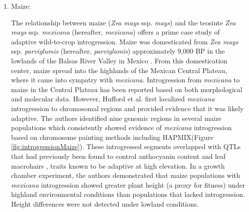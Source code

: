 \documentclass[11pt]{article}
\begin{document}
\begin{enumerate}
\item{Maize:}

The relationship between maize (\emph{Zea mays} ssp. \emph{mays}) and the teosinte \emph{Zea mays} ssp. \emph{mexicana} (hereafter, \emph{mexicana}) offers a prime case study of adaptive wild-to-crop introgression.
Maize was domesticated from \emph{Zea mays} ssp. \emph{parviglumis} (hereafter, \emph{parviglumis})  approximately 9,000 BP in the lowlands of the Balsas River Valley in Mexico \cite{matsuoka2002single}.
From this domestication center, maize spread into the highlands of the Mexican Central Plateau, where it came into sympatry with \emph{mexicana}.
Introgression from \emph{mexicana} to maize in the Central Plateau has been reported based on both morphological \cite {wilkes1977} and molecular \cite{vanHeerwaarden2011, doebley1987} data.
However, Hufford et al. \cite{hufford2013} first localized \emph{mexicana} introgression to chromosomal regions and provided evidence that it was likely adaptive.
The authors identified nine genomic regions in several maize populations which consistently showed evidence of \emph{mexicana} introgression based on chromosome painting methods including HAPMIX(Figure \ref{fig:introgressionMaize}).
These introgressed segments overlapped with QTLs that had previously been found to control anthocyanin content and leaf macrohairs \cite{lauter2004}, traits known to be adaptive at high elevation.
In a growth chamber experiment, the authors demonstrated that maize populations with \emph{mexicana} introgression showed greater plant height (a proxy for fitness) under highland environmental conditions than populations that lacked introgression.
Height differences were not detected under lowland conditions.



\end{enumerate}
\end{document}
